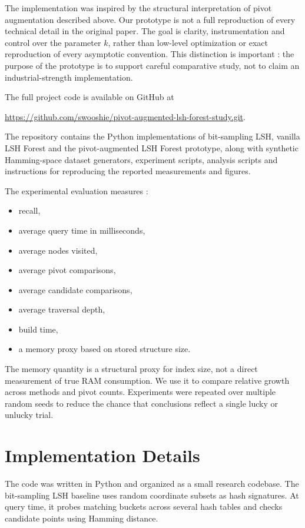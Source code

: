 \documentclass[11pt]{article}
\begin{document}
The implementation was inspired by the structural interpretation of pivot augmentation described above. Our prototype is not a full reproduction of every technical detail in the original paper. The goal is clarity, instrumentation and control over the parameter $k$, rather than low-level optimization or exact reproduction of every asymptotic convention. This distinction is important : the purpose of the prototype is to support careful comparative study, not to claim an industrial-strength implementation.

The full project code is available on GitHub at
\begin{center}
    \url{https://github.com/swooshie/pivot-augmented-lsh-forest-study.git}.
\end{center}
The repository contains the Python implementations of bit-sampling LSH, vanilla LSH Forest and the pivot-augmented LSH Forest prototype, along with synthetic Hamming-space dataset generators, experiment scripts, analysis scripts and instructions for reproducing the reported measurements and figures.

The experimental evaluation measures :
\begin{itemize}[leftmargin=*]
    \item recall,
    \item average query time in milliseconds,
    \item average nodes visited,
    \item average pivot comparisons,
    \item average candidate comparisons,
    \item average traversal depth,
    \item build time,
    \item a memory proxy based on stored structure size.
\end{itemize}

The memory quantity is a structural proxy for index size, not a direct measurement of true RAM consumption. We use it to compare relative growth across methods and pivot counts. Experiments were repeated over multiple random seeds to reduce the chance that conclusions reflect a single lucky or unlucky trial.

\section{Implementation Details}

The code was written in Python and organized as a small research codebase. The bit-sampling LSH baseline uses random coordinate subsets as hash signatures. At query time, it probes matching buckets across several hash tables and checks candidate points using Hamming distance.
\end{document}
